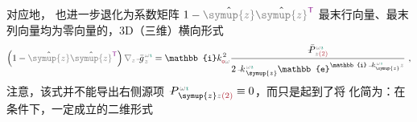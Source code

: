 对应地， 也进一步退化为系数矩阵 $1 - \hat{\mathcolor{gray}{\symup{z}}} \hat{\mathcolor{gray}{\symup{z}}}^{\mathsf{\textcolor{Plum}{T}}}$ 最末行向量、最末列向量均为零向量的，3D（三维）横向形式
\begin{align}  \label{eq:simplify6-V2'-SVA-V_1singular-nokxky-zeta}
	\left( 1 - \hat{\mathcolor{gray}{\symup{z}}} \hat{\mathcolor{gray}{\symup{z}}}^{\mathsf{\textcolor{Plum}{T}}} \right) \mathcolor{gray}{\nabla_z} \Xint{{}^{}_{\mathcolor{gray}{-}}}{10}{\bar{g}}^{\;\!\mathcolor{gray}{\omega} \textcolor{PineGreen}{\imath}}_{\;\! \mathcolor{gray}{z}} = \mathbb{i} k_{\textcolor{Maroon}{\mathsf{o}} \mathcolor{gray}{\omega}}^{\;\! 2} \frac{\Xint{\mathcolor{gray}{-}}{25}{\bar{P}}^{\;\! \mathcolor{gray}{\omega} \textcolor{PineGreen}{\imath}}_{\;\! \mathcolor{gray}{z} \textcolor{Maroon}{(2)}}}{2 \Xint{\begin{smallmatrix} ~ \\ {}^{}_{\mathcolor{gray}{-}} \\ ~ \end{smallmatrix}}{15}{k}_{\;\! \symup{z}}^{\;\! \mathcolor{gray}{\omega} \textcolor{PineGreen}{\imath}} \mathbb{e}^{\mathbb{i} \Xint{\begin{smallmatrix} ~ \\ {}^{}_{\mathcolor{gray}{-}} \\ ~ \end{smallmatrix}}{15}{k}_{\symup{z}}^{\;\! \mathcolor{gray}{\omega} \textcolor{PineGreen}{\imath}} \mathcolor{gray}{z}}} ~,
\end{align}
注意，该式并不能导出右侧源项 $\Xint{\mathcolor{gray}{-}}{24}{P}^{\;\! \mathcolor{gray}{\omega} \textcolor{PineGreen}{\imath}}_{\;\! \symup{z} \mathcolor{gray}{z} \textcolor{Maroon}{(2)}} \equiv 0$，而只是起到了将  化简为：在  条件下，一定成立的二维形式
